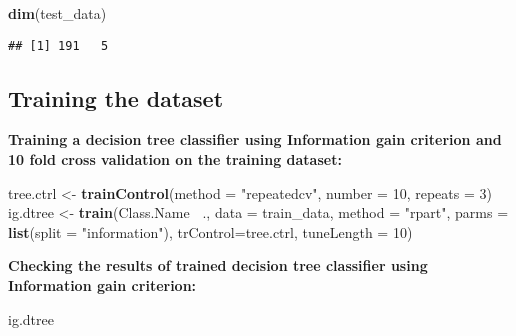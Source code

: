 \documentclass[
]{article}
\newenvironment{Shaded}{\begin{snugshade}}{\end{snugshade}}
\newcommand{\DataTypeTok}[1]{\textcolor[rgb]{0.13,0.29,0.53}{#1}}
\newcommand{\DecValTok}[1]{\textcolor[rgb]{0.00,0.00,0.81}{#1}}
\newcommand{\KeywordTok}[1]{\textcolor[rgb]{0.13,0.29,0.53}{\textbf{#1}}}
\newcommand{\NormalTok}[1]{#1}
\newcommand{\OperatorTok}[1]{\textcolor[rgb]{0.81,0.36,0.00}{\textbf{#1}}}
\newcommand{\StringTok}[1]{\textcolor[rgb]{0.31,0.60,0.02}{#1}}
\begin{document}
\begin{Shaded}
\begin{Highlighting}[]
\KeywordTok{dim}\NormalTok{(test_data)}
\end{Highlighting}
\end{Shaded}

\begin{verbatim}
## [1] 191   5
\end{verbatim}

\hypertarget{training-the-dataset}{%
\subsection{\texorpdfstring{\textbf{Training the
dataset}}{Training the dataset}}\label{training-the-dataset}}

\textbf{Training a decision tree classifier using Information gain
criterion and 10 fold cross validation on the training dataset:}

\begin{Shaded}
\begin{Highlighting}[]
\NormalTok{tree.ctrl <-}\StringTok{ }\KeywordTok{trainControl}\NormalTok{(}\DataTypeTok{method =} \StringTok{"repeatedcv"}\NormalTok{, }\DataTypeTok{number =} \DecValTok{10}\NormalTok{, }\DataTypeTok{repeats =} \DecValTok{3}\NormalTok{)}
\NormalTok{ig.dtree <-}\StringTok{ }\KeywordTok{train}\NormalTok{(Class.Name }\OperatorTok{~}\NormalTok{., }\DataTypeTok{data =}\NormalTok{ train_data, }\DataTypeTok{method =} \StringTok{"rpart"}\NormalTok{,}
                   \DataTypeTok{parms =} \KeywordTok{list}\NormalTok{(}\DataTypeTok{split =} \StringTok{"information"}\NormalTok{),}
                   \DataTypeTok{trControl=}\NormalTok{tree.ctrl,}
                   \DataTypeTok{tuneLength =} \DecValTok{10}\NormalTok{)}
\end{Highlighting}
\end{Shaded}

\textbf{Checking the results of trained decision tree classifier using
Information gain criterion:}

\begin{Shaded}
\begin{Highlighting}[]
\NormalTok{ig.dtree}
\end{Highlighting}
\end{Shaded}
\end{document}
